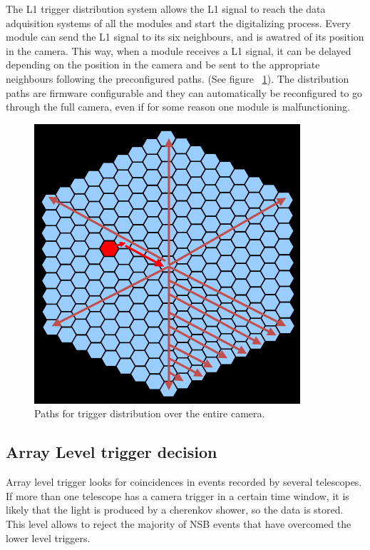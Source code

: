 \documentclass[a4paper,10pt]{book}
\begin{document}
The L1 trigger distribution system allows the L1 signal to reach the data adquisition systems of all the modules and start the digitalizing 
process. Every module can send the L1 signal to its six neighbours, and is awatred of its position in the camera. This way, when a module receives
a L1 signal, it can be delayed depending on the position in the camera and be sent to the appropriate neighbours following the preconfigured paths. (See figure ~\ref{fig:trigpaths}). The distribution paths are firmware configurable and they can automatically be reconfigured to go through the full 
camera, even if for some reason one module is malfunctioning.

\begin{figure}
\centering
 \includegraphics[bb=0 0 1296 675, scale=0.5]{./triggerpaths.png}
  \caption{Paths for trigger distribution over the entire camera.}
    \label{fig:trigpaths}
\end{figure}

\subsection{Array Level trigger decision}
Array level trigger looks for coincidences in events recorded by several telescopes. If more than one telescope has a camera trigger in
a certain time window, it is likely that the light is produced by a cherenkov shower, so the data is stored. This level allows to reject
the majority of NSB events that have overcomed the lower level triggers. 
\end{document}
